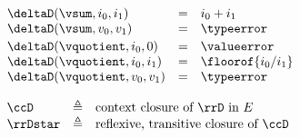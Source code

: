 \begin{flushleft}
\medskip
{}
$\begin{array}{l c l}
  \deltaD(\vsum, i_0, i_1) & = & i_0 + i_1
\\
  \deltaD(\vsum, v_0, v_1) & = & \typeerror
\\[0.5ex]
  \deltaD(\vquotient, i_0, 0) & = & \valueerror
\\
  \deltaD(\vquotient, i_0, i_1) & = & \floorof{i_0 / i_1}
\\
  \deltaD(\vquotient, v_0, v_1) & = & \typeerror
\end{array}$

\medskip
{}
\begin{mathpar}



\end{mathpar}

\medskip
$\begin{array}{l c l}
  \ccD & \triangleq & \mbox{context closure of $\rrD$ in $E$}
\\
  \rrDstar & \triangleq & \mbox{reflexive, transitive closure of $\ccD$}
\end{array}$



\end{flushleft}
